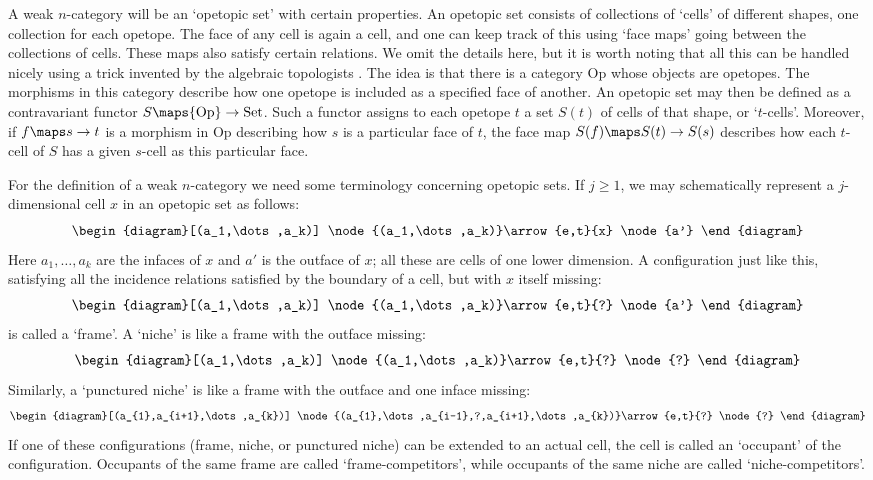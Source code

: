 A weak $n$-category will be an `opetopic set' with certain properties.
An opetopic set consists of collections of `cells' of different shapes,
one collection for each opetope.  The face of any cell is again a cell,
and one can keep track of this using `face maps' going between the
collections of cells.  These maps also satisfy certain relations.  We
omit the details here, but it is worth noting that all this can be
handled nicely using a trick invented by the algebraic topologists
\cite{May}.  The idea is that there is a category Op whose objects are
opetopes.  The morphisms in this category describe how one opetope is
included as a specified face of another.  An opetopic set may then be
defined as a contravariant functor $S \maps {\rm Op} \to {\rm Set}$.
Such a functor assigns to each opetope $t$ a set $S(t)$ of cells of
that shape, or `$t$-cells'.  Moreover, if $f \maps s \to t$ is a
morphism in Op describing how $s$ is a particular face of $t$, the face
map $S(f) \maps S(t) \to S(s)$ describes how each $t$-cell of $S$ has a
given $s$-cell as this particular face.

For the definition of a weak $n$-category we need some terminology
concerning opetopic sets.  If $j \ge 1$, we may schematically represent
a $j$-dimensional cell $x$ in an opetopic set as follows:
\[ 
\begin{diagram}[(a_1,\dots,a_k)]
\node{(a_1,\dots,a_k)}\arrow{e,t}{x} \node{a'}
\end{diagram} 
\]
Here $a_1,\dots,a_k$ are the infaces of $x$ and $a'$ is the outface of
$x$; all these are cells of one lower dimension.  
A configuration just like this, satisfying all the incidence
relations satisfied by the boundary of a cell, but with $x$ itself
missing:
\[
\begin{diagram}[(a_1,\dots,a_k)]
\node{(a_1,\dots,a_k)}\arrow{e,t}{?} \node{a'}
\end{diagram}
\] 
is called a `frame'.  A `niche' is like a frame with the outface missing:
\[ 
\begin{diagram}[(a_1,\dots,a_k)]
\node{(a_1,\dots,a_k)}\arrow{e,t}{?} \node{?}
\end{diagram} 
\]
Similarly, a `punctured niche' is like a frame with the outface
and one inface missing:
\[ 
\begin{diagram}[(a_{1},a_{i+1},\dots,a_{k})]
\node{(a_{1},\dots,a_{i-1},?,a_{i+1},\dots,a_{k})}\arrow{e,t}{?} \node{?}
\end{diagram} 
\]
If one of these configurations (frame, niche,
or punctured niche) can be extended to an actual cell, the
cell is called an `occupant' of the configuration.  Occupants
of the same frame are called `frame-competitors', while occupants of
the same niche are called `niche-competitors'.  

